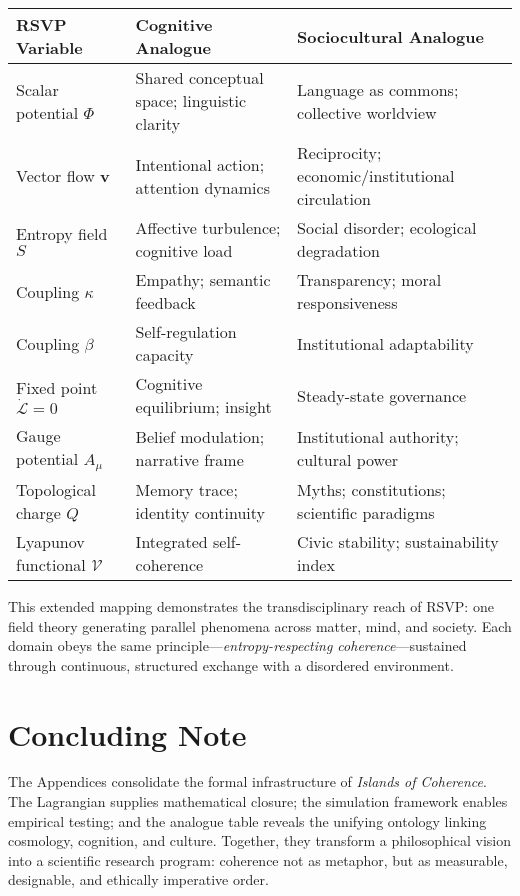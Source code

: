 \documentclass[12pt,a4paper]{article}
\begin{document}
\begin{center}
\begin{tabular}{@{}p{4.2cm}p{4.8cm}p{6.5cm}@{}}
\toprule
\textbf{RSVP Variable} & \textbf{Cognitive Analogue} & \textbf{Sociocultural Analogue}\\
\midrule
Scalar potential $\Phi$ &
Shared conceptual space; linguistic clarity &
Language as commons; collective worldview \\[6pt]
Vector flow $\bm{v}$ &
Intentional action; attention dynamics &
Reciprocity; economic/institutional circulation \\[6pt]
Entropy field $S$ &
Affective turbulence; cognitive load &
Social disorder; ecological degradation \\[6pt]
Coupling $\kappa$ &
Empathy; semantic feedback &
Transparency; moral responsiveness \\[6pt]
Coupling $\beta$ &
Self-regulation capacity &
Institutional adaptability \\[6pt]
Fixed point $\dot{\mathcal{L}}=0$ &
Cognitive equilibrium; insight &
Steady-state governance \\[6pt]
Gauge potential $A_\mu$ &
Belief modulation; narrative frame &
Institutional authority; cultural power \\[6pt]
Topological charge $Q$ &
Memory trace; identity continuity &
Myths; constitutions; scientific paradigms \\[6pt]
Lyapunov functional $\mathcal{V}$ &
Integrated self-coherence &
Civic stability; sustainability index \\
\bottomrule
\end{tabular}
\end{center}

This extended mapping demonstrates the transdisciplinary reach of RSVP: one field theory generating parallel phenomena across matter, mind, and society. Each domain obeys the same principle—\emph{entropy-respecting coherence}—sustained through continuous, structured exchange with a disordered environment.

\section*{Concluding Note}

The Appendices consolidate the formal infrastructure of \emph{Islands of Coherence}. The Lagrangian supplies mathematical closure; the simulation framework enables empirical testing; and the analogue table reveals the unifying ontology linking cosmology, cognition, and culture. Together, they transform a philosophical vision into a scientific research program: coherence not as metaphor, but as measurable, designable, and ethically imperative order.
\end{document}
